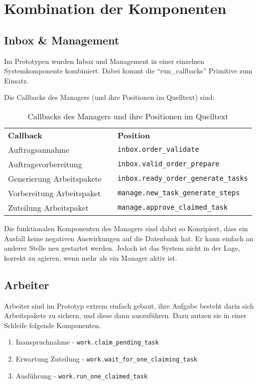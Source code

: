 \section{Kombination der Komponenten}
\subsection{Inbox \& Management}

Im Prototypen wurden Inbox und Management in einer einzelnen Systemkomponente  kombiniert.
Dabei kommt die ``run\_callbacks'' Primitive zum Einsatz.

Die Callbacks des Managers (und ihre Positionen im Quelltext) sind:
\begin{table}
\begin{tabular}{lcl}
    \textbf{Callback} && \textbf{Position} \\
    Auftragsannahme && \verb|inbox.order_validate| \\
    Auftragsvorbereitung && \verb|inbox.valid_order_prepare| \\
    Generierung Arbeitspakete && \verb|inbox.ready_order_generate_tasks| \\
    Vorbereitung Arbeitspaket && \verb|manage.new_task_generate_steps| \\
    Zuteilung Arbeitspaket && \verb|manage.approve_claimed_task| \\
\end{tabular}
\caption{Callbacks des Managers und ihre Positionen im Quelltext}
\label{tab:callbacks-manager}
\end{table}

Die funktionalen Komponenten des Managers sind dabei so Konzipiert,
dass ein Ausfall keine negativen Auswirkungen auf die Datenbank hat.
Er kann einfach an anderer Stelle neu gestartet werden.
Jedoch ist das System nicht in der Lage, korrekt zu agieren, wenn mehr als ein Manager aktiv ist.
\subsection{Arbeiter}

Arbeiter sind im Prototyp extrem einfach gebaut,
ihre Aufgabe besteht darin sich Arbeitspakete zu sichern,
und diese dann auszuführen.
Dazu nutzen sie in einer Schleife folgende Komponenten.

\begin{enumerate}
    \item Inanspruchnahme - \verb|work.claim_pending_task|
    \item Erwartung Zuteilung - \verb|work.wait_for_one_claiming_task|
    \item Ausführung - \verb|work.run_one_claimed_task|
\end{enumerate}


